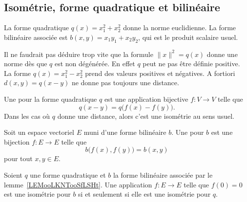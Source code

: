 \subsection{Isométrie, forme quadratique et bilinéaire}

\begin{example}
	La forme quadratique \( q(x)=x_1^2+x_2^2\) donne la norme euclidienne. La forme bilinéaire associée est \( b(x,y)=x_1y_1+x_2y_2\), qui est le produit scalaire usuel.
\end{example}

Il ne faudrait pas déduire trop vite que la formule \( \| x \|^2=q(x)\) donne une norme dès que \( q\) est non dégénérée. En effet \( q\) peut ne pas être définie positive. La forme \( q(x)=x_1^2-x_2^2\) prend des valeurs positives et négatives. A fortiori \( d(x,y)=q(x-y)\) ne donne pas toujours une distance.

\begin{definition}      \label{DEFooECTUooRxBhHf}
	Une  pour la forme quadratique \( q\) est une application bijective \( f\colon V\to V\) telle que
	\begin{equation}
		q(x-y)=q\big( f(x)-f(y) \big).
	\end{equation}
	Dans les cas où \( q\) donne une distance, alors c'est une isométrie au sens usuel.
\end{definition}

\begin{definition}      \label{DEFooIQURooMeQuqX}
	Soit un espace vectoriel \( E\) muni d'une forme bilinéaire \( b\). Une  pour \( b\) est une bijection \( f\colon E\to E\) telle que
	\begin{equation}
		b\big( f(x),f(y) \big)=b(x,y)
	\end{equation}
	pour tout \( x,y\in E\).
\end{definition}

\begin{lemma}   \label{LemewGJmM}
	Soient \( q\) une forme quadratique et \( b\) la forme bilinéaire associée par le lemme~\ref{LEMooLKNTooSfLSHt}. Une application \( f\colon E\to E\) telle que \( f(0)=0\) est une isométrie pour \( b\) si et seulement si elle est une isométrie pour \( q\).
\end{lemma}

